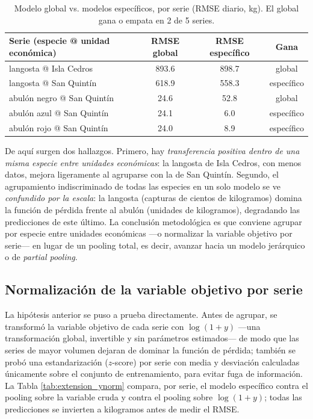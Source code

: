 \documentclass[twoside,11pt]{article}
\begin{document}
\begin{table}[htbp]
\centering
\begin{tabular}{lccc}
\toprule
Serie (especie @ unidad económica) & RMSE global & RMSE específico & Gana \\
\midrule
langosta @ Isla Cedros & 893.6 & 898.7 & global \\
langosta @ San Quintín & 618.9 & 558.3 & específico \\
abulón negro @ San Quintín & 24.6 & 52.8 & global \\
abulón azul @ San Quintín & 24.1 & 6.0 & específico \\
abulón rojo @ San Quintín & 24.0 & 8.9 & específico \\
\bottomrule
\end{tabular}
\caption{Modelo global vs. modelos específicos, por serie (RMSE diario, kg). El global gana o empata en 2 de 5 series.}
\label{tab:extension_global}
\end{table}

De aquí surgen dos hallazgos. Primero, hay \emph{transferencia positiva dentro de una misma especie entre unidades económicas}: la langosta de Isla Cedros, con menos datos, mejora ligeramente al agruparse con la de San Quintín. Segundo, el agrupamiento indiscriminado de todas las especies en un solo modelo se ve \emph{confundido por la escala}: la langosta (capturas de cientos de kilogramos) domina la función de pérdida frente al abulón (unidades de kilogramos), degradando las predicciones de este último. La conclusión metodológica es que conviene agrupar por especie entre unidades económicas —o normalizar la variable objetivo por serie— en lugar de un pooling total, es decir, avanzar hacia un modelo jerárquico o de \emph{partial pooling}.

\subsection{Normalización de la variable objetivo por serie}
La hipótesis anterior se puso a prueba directamente. Antes de agrupar, se transformó la variable objetivo de cada serie con $\log(1+y)$ —una transformación global, invertible y sin parámetros estimados— de modo que las series de mayor volumen dejaran de dominar la función de pérdida; también se probó una estandarización ($z$-score) por serie con media y desviación calculadas únicamente sobre el conjunto de entrenamiento, para evitar fuga de información. La Tabla \ref{tab:extension_ynorm} compara, por serie, el modelo específico contra el pooling sobre la variable cruda y contra el pooling sobre $\log(1+y)$; todas las predicciones se invierten a kilogramos antes de medir el RMSE.
\end{document}
